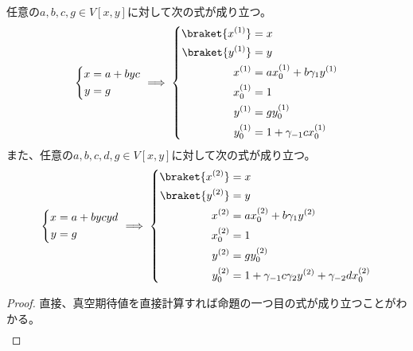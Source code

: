 {	\begin{proposition}[文法の線形化]\label{prop:文法の線形化} %
		任意の$a,b,c,g\in V[x,y]$に対して次の式が成り立つ。
		\begin{equation*}\begin{split}
			\left\{\begin{split}
				x &= a + byc \\
				y &= g \\
			\end{split}\right. \implies \left\{\begin{split}
				\braket{x^{(1)}} &= x \\
				\braket{y^{(1)}} &= y \\
				x^{(1)} &= ax_0^{(1)} + b\gamma_1y^{(1)} \\
				x_0^{(1)} &= 1 \\
				y^{(1)} &= gy_0^{(1)} \\
				y_0^{(1)} &= 1 + \gamma_{-1}cx_0^{(1)} \\
			\end{split}\right.
		\end{split}\end{equation*}
		また、任意の$a,b,c,d,g\in V[x,y]$に対して次の式が成り立つ。
		\begin{equation*}\begin{split}
			\left\{\begin{split}
				x &= a + bycyd \\
				y &= g \\
			\end{split}\right. \implies \left\{\begin{split}
				\braket{x^{(2)}} &= x \\
				\braket{y^{(2)}} &= y \\
				x^{(2)} &= ax_0^{(2)} + b\gamma_1y^{(2)} \\
				x_0^{(2)} &= 1 \\
				y^{(2)} &= gy_0^{(2)} \\
				y_0^{(2)} &= 1 + \gamma_{-1}c\gamma_2y^{(2)} + \gamma_{-2}dx_0^{(2)} \\
			\end{split}\right.
		\end{split}\end{equation*}
	\end{proposition} %
	\begin{proof} %
		直接、真空期待値を直接計算すれば命題の一つ目の式が成り立つことがわかる。
		\begin{equation*}\begin{split}

\end{split}
\end{equation*}
\end{proof}}
